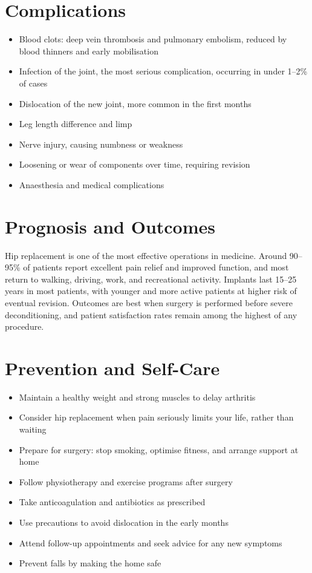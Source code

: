 \section*{Complications}
\begin{itemize}
    \item Blood clots: deep vein thrombosis and pulmonary embolism, reduced by blood thinners and early mobilisation
    \item Infection of the joint, the most serious complication, occurring in under 1--2\% of cases
    \item Dislocation of the new joint, more common in the first months
    \item Leg length difference and limp
    \item Nerve injury, causing numbness or weakness
    \item Loosening or wear of components over time, requiring revision
    \item Anaesthesia and medical complications
\end{itemize}

\section*{Prognosis and Outcomes}
Hip replacement is one of the most effective operations in medicine. Around 90--95\% of patients report excellent pain relief and improved function, and most return to walking, driving, work, and recreational activity. Implants last 15--25 years in most patients, with younger and more active patients at higher risk of eventual revision. Outcomes are best when surgery is performed before severe deconditioning, and patient satisfaction rates remain among the highest of any procedure.

\section*{Prevention and Self-Care}
\begin{itemize}
    \item Maintain a healthy weight and strong muscles to delay arthritis
    \item Consider hip replacement when pain seriously limits your life, rather than waiting
    \item Prepare for surgery: stop smoking, optimise fitness, and arrange support at home
    \item Follow physiotherapy and exercise programs after surgery
    \item Take anticoagulation and antibiotics as prescribed
    \item Use precautions to avoid dislocation in the early months
    \item Attend follow-up appointments and seek advice for any new symptoms
    \item Prevent falls by making the home safe
\end{itemize}

